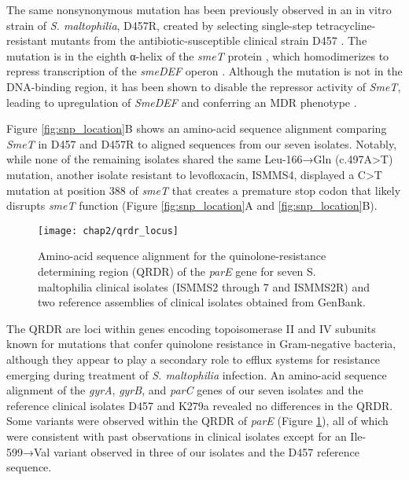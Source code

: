 The same nonsynonymous mutation has been previously observed in an in vitro strain of \emph{S. maltophilia}, D457R, created by selecting single-step tetracycline-resistant mutants from the antibiotic-susceptible clinical strain D457 \autocite{Alonso1997,Sanchez2002}. The mutation is in the eighth α-helix of the \emph{smeT} protein \autocite{Hernandez2009}, which homodimerizes to repress transcription of the \emph{smeDEF} operon \autocite{Hernandez2009,Sanchez2002}. Although the mutation is not in the DNA-binding region, it has been shown to disable the repressor activity of \emph{SmeT},\autocite{Sanchez2002} leading to upregulation of \emph{SmeDEF} and conferring an MDR phenotype \autocite{Alonso2001}.

Figure \ref{fig:snp_location}B shows an amino-acid sequence alignment comparing \emph{SmeT} in D457 and D457R to aligned sequences from our seven isolates. Notably, while none of the remaining isolates shared the same Leu-166→Gln (c.497A>T) mutation, another isolate resistant to levofloxacin, ISMMS4, displayed a C>T mutation at position 388 of \emph{smeT} that creates a premature stop codon that likely disrupts \emph{smeT} function (Figure \ref{fig:snp_location}A and \ref{fig:snp_location}B).

\begin{figure}[htb]
  \texttt{[image: chap2/qrdr\_locus]}               
  \caption[Amino-acid sequence alignment for the quinolone-resistance determining region (QRDR) of the \emph{parE} gene]{Amino-acid sequence alignment for the quinolone-resistance determining region (QRDR) of the \emph{parE} gene for seven S. maltophilia clinical isolates (ISMMS2 through 7 and ISMMS2R) and two reference assemblies of clinical isolates obtained from GenBank.}
  \label{fig:qrdr_locus}
\end{figure}
 
The QRDR are loci within genes encoding topoisomerase II and IV subunits known for mutations that confer quinolone resistance in Gram-negative bacteria, although they appear to play a secondary role to efflux systems for resistance emerging during treatment of \emph{S. maltophilia} infection.\autocite{Valdezate2005} An amino-acid sequence alignment of the \emph{gyrA}, \emph{gyrB}, and \emph{parC} genes of our seven isolates and the reference clinical isolates D457 and K279a revealed no differences in the QRDR. Some variants were observed within the QRDR of \emph{parE} (Figure \ref{fig:qrdr_locus}), all of which were consistent with past observations in clinical isolates \autocite{Valdezate2002} except for an Ile-599→Val variant observed in three of our isolates and the D457 reference sequence.

